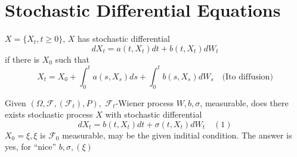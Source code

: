 \documentclass[english]{article}
\newcommand{\F}{\mathcal F}
\begin{document}
\section{Stochastic Differential Equations}
$X=\{X_t, t\geq 0\}$, $X$ has stochastic differential
$$dX_t = a(t, X_t) dt + b (t, X_t) dW_t$$
if there is $X_0$ such that 
$$X_t= X_0 + \int^t_0 a(s, X_s) ds + \int^t_0 b(s, X_s) dW_s \quad \text{(Ito diffusion)}$$

Given $(\Omega, \F, (\F_t), P),$ $\F_t$-Wiener process $W, b, \sigma$, measurable, does there exists  stochastic process $X$ with stochastic differential
$$dX_t = b(t,X_t)dt + \sigma(t, X_t) dW_t \quad (1)$$
$X_0 = \xi, \xi$ is $\F_0$ measurable, may be the given inditial condition.\newline
The answer is yes, for ``nice'' $b, \sigma, (\xi)$ \newline
\end{document}
